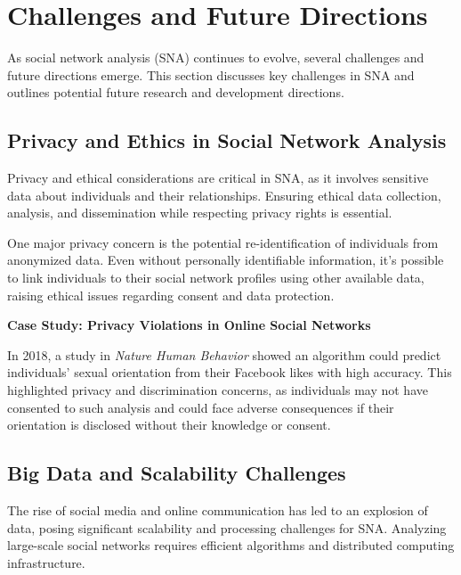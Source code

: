 \documentclass[12pt]{book} %
\begin{document}
\section{Challenges and Future Directions}

As social network analysis (SNA) continues to evolve, several challenges and future directions emerge. This section discusses key challenges in SNA and outlines potential future research and development directions.

\subsection{Privacy and Ethics in Social Network Analysis}

Privacy and ethical considerations are critical in SNA, as it involves sensitive data about individuals and their relationships. Ensuring ethical data collection, analysis, and dissemination while respecting privacy rights is essential.

One major privacy concern is the potential re-identification of individuals from anonymized data. Even without personally identifiable information, it's possible to link individuals to their social network profiles using other available data, raising ethical issues regarding consent and data protection.

\textbf{Case Study: Privacy Violations in Online Social Networks}

In 2018, a study in \textit{Nature Human Behavior} showed an algorithm could predict individuals' sexual orientation from their Facebook likes with high accuracy. This highlighted privacy and discrimination concerns, as individuals may not have consented to such analysis and could face adverse consequences if their orientation is disclosed without their knowledge or consent.

\subsection{Big Data and Scalability Challenges}

The rise of social media and online communication has led to an explosion of data, posing significant scalability and processing challenges for SNA. Analyzing large-scale social networks requires efficient algorithms and distributed computing infrastructure.
\end{document}
